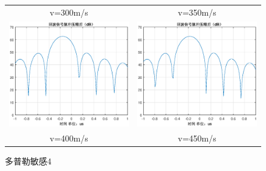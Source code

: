 \documentclass[12pt]{article}
\begin{document}
\begin{figure}[htbp]
\begin{tabular}{cc}
    v=300m/s&v=350m/s\\
  \includegraphics[width=.5\textwidth]{Doppler_sensitivity_0400}&\includegraphics[width=.5\textwidth]{Doppler_sensitivity_0450}\\
    v=400m/s&v=450m/s\\
  \end{tabular}
  \caption{多普勒敏感4}\label{Doppler_sensitivity_0004}
\end{figure}
\end{document}

